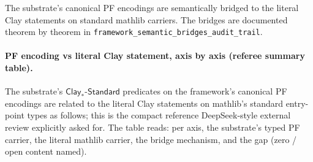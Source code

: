 \documentclass[11pt,a4paper]{amsart}
\theoremstyle{plain}
\theoremstyle{definition}
\begin{document}
The substrate's canonical PF encodings are semantically bridged to the literal Clay statements on standard mathlib carriers. The bridges are documented theorem by theorem in \texttt{framework\_semantic\_bridges\_audit\_trail}.

\paragraph{PF encoding vs literal Clay statement, axis by axis (referee summary table).} The substrate's $\textsf{Clay}_{*}\textsf{-Standard}$ predicates on the framework's canonical PF encodings are related to the literal Clay statements on mathlib's standard entry-point types as follows; this is the compact reference DeepSeek-style external review explicitly asked for. The table reads: per axis, the substrate's typed PF carrier, the literal mathlib carrier, the bridge mechanism, and the gap (zero / open content named).
\end{document}
